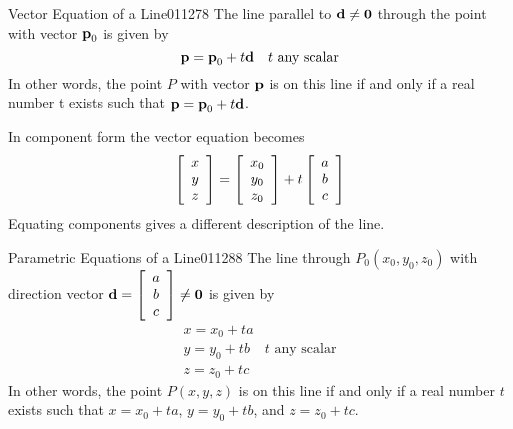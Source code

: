 \begin{theorem*}{Vector Equation of a Line}{011278}
The line parallel to $\textbf{d} \neq \textbf{0}$ through the point with vector $\textbf{p}_{0}$ is given by
\begin{equation*}
\textbf{p} = \textbf{p}_{0} + t\textbf{d} \quad  t \mbox{ any scalar}
\end{equation*}
In other words, the point $P$ with vector $\textbf{p}$ is on this line if and only if a real number t exists such that $\textbf{p} = \textbf{p}_{0} + t\textbf{d}$.
\end{theorem*}

\noindent In component form the vector equation becomes
\begin{equation*}
\left[
\begin{array}{c}
x \\
y \\
z  
\end{array}
\right]
=
\left[
\begin{array}{c}
x_{0} \\
y_{0} \\
z_{0}  
\end{array}
\right]
+
t
\left[
\begin{array}{c}
a \\
b \\
c  
\end{array}
\right]
\end{equation*}
Equating components gives a different description of the line.


\begin{theorem*}{Parametric Equations of a Line}{011288}
The line through $P_{0}(x_{0}, y_{0}, z_{0})$ with direction vector 
$\textbf{d} = \left[
\begin{array}{c}
a \\
b \\
c  
\end{array}
\right]
\neq \textbf{0}$ is given by
\begin{equation*}
\begin{array}{ll}
x = x_{0} + ta &\\
y = y_{0} + tb & t \mbox{ any scalar}\\
z = z_{0} + tc &
\end{array}
\end{equation*}
In other words, the point $P(x, y, z)$ is on this line if and only if a real number $t$ exists such that $x = x_{0} + ta$, $y = y_{0} + tb$, and $z = z_{0} + tc$.
\end{theorem*}


